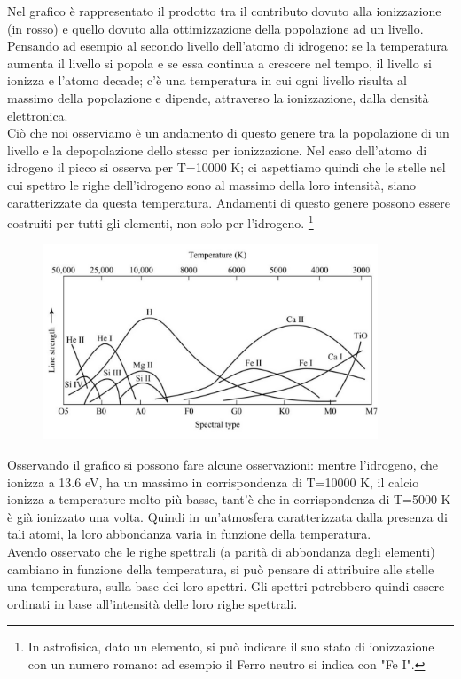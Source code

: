 \documentclass[a4paper,11pt]{article}
\begin{document}
      Nel grafico è rappresentato il prodotto tra il contributo dovuto alla ionizzazione (in rosso) e quello dovuto alla ottimizzazione della popolazione ad un livello. Pensando ad esempio al secondo livello dell'atomo di idrogeno: se la temperatura aumenta il livello si popola e se essa continua a crescere nel tempo, il livello si ionizza e l'atomo decade; c'è una temperatura in cui ogni livello risulta al massimo della popolazione e dipende, attraverso la ionizzazione, dalla densità elettronica. \\Ciò che noi osserviamo è un andamento di questo genere tra la popolazione di un livello e la depopolazione dello stesso per ionizzazione. Nel caso dell'atomo di idrogeno il picco si osserva per T=10000 K; ci aspettiamo quindi che le stelle nel cui spettro le righe dell'idrogeno sono al massimo della loro intensità, siano caratterizzate da questa temperatura. Andamenti di questo genere possono essere costruiti per tutti gli elementi, non solo per l'idrogeno. \footnote{In astrofisica, dato un elemento, si può indicare il suo stato di ionizzazione con un numero romano: ad esempio il Ferro neutro si indica con "Fe I".}
      
     \begin{figure}[h!!]
        \centering
        \includegraphics[width=10cm]{173507.jpg}
        \label{}
      \end{figure}

    Osservando il grafico si possono fare alcune osservazioni: mentre l'idrogeno, che ionizza a 13.6 eV, ha un massimo in corrispondenza di T=10000 K, il calcio ionizza a temperature molto più basse, tant'è che in corrispondenza di T=5000 K è già ionizzato una volta. Quindi in un'atmosfera caratterizzata dalla presenza di tali atomi, la loro abbondanza varia in funzione della temperatura.\\ Avendo osservato che le righe spettrali (a parità di abbondanza degli elementi) cambiano in funzione della temperatura, si può pensare di attribuire alle stelle una temperatura, sulla base dei loro spettri. Gli spettri potrebbero quindi essere ordinati in base all'intensità delle loro righe spettrali.
  
\end{document}
